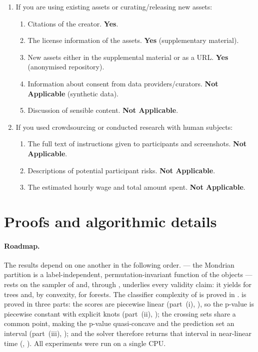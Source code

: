 \documentclass[twoside]{article}
\numberwithin{equation}{section}
\theoremstyle{plain}
\theoremstyle{definition}
\theoremstyle{remark}
\begin{document}
\begin{enumerate}
  \item If you are using existing assets or curating/releasing new assets:
  \begin{enumerate}
    \item Citations of the creator. \textbf{Yes}.
    \item The license information of the assets. \textbf{Yes} (supplementary
      material).
    \item New assets either in the supplemental material or as a URL. \textbf{Yes}
      (anonymised repository).
    \item Information about consent from data providers/curators. \textbf{Not
      Applicable} (synthetic data).
    \item Discussion of sensible content. \textbf{Not Applicable}.
  \end{enumerate}

  \item If you used crowdsourcing or conducted research with human subjects:
  \begin{enumerate}
    \item The full text of instructions given to participants and screenshots.
      \textbf{Not Applicable}.
    \item Descriptions of potential participant risks. \textbf{Not Applicable}.
    \item The estimated hourly wage and total amount spent. \textbf{Not Applicable}.
  \end{enumerate}

\end{enumerate}

\appendix
\section{Proofs and algorithmic details}\label{app:proofs}

\paragraph{Roadmap.}
The results depend on one another in the following order. 
--- the Mondrian partition is a label-independent, permutation-invariant function of
the objects --- rests on the sampler of  and, through
, underlies every validity claim: it yields
 for trees and, by convexity,  for
forests. The classifier complexity of  is proved in
.  is proved in three parts: the scores
are piecewise linear (part~(i), ), so the p-value is
piecewise constant with explicit knots (part~(ii), ); the
crossing sets share a common point, making the p-value quasi-concave and the
prediction set an interval (part~(iii), ); and
the solver therefore returns that interval in near-linear time (,
). All experiments were run on a single CPU.
\end{document}
